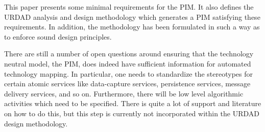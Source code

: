 \documentclass[reviewcopy]{elsart}
\begin{document}
This paper presents some minimal requirements for the PIM. It also defines
the URDAD analysis and design methodology which generates a PIM satisfying
these requirements. In addition, the methodology has been formulated in such a
 way as to enforce sound design principles.

There are still a number of open questions around ensuring that the technology
neutral model, the PIM, does indeed have sufficient information for automated
technology mapping. In particular, one needs to standardize the stereotypes for
certain atomic services like data-capture services, persistence services,
message delivery services, and so on. Furthermore, there will be low level
algorithmic activities which need to be specified. There is quite a lot of
support and literature on how to do this, but this step is currently not
incorporated within the URDAD design methodology.
\end{document}
